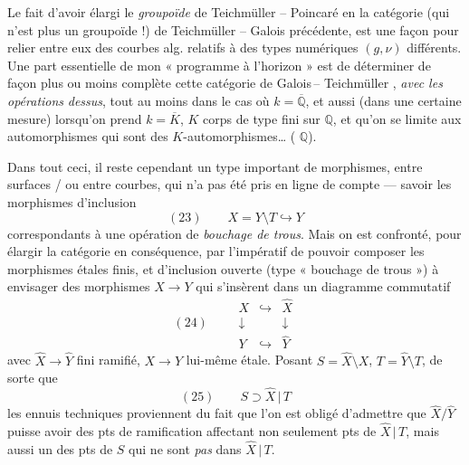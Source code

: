\documentclass[11pt,a4paper]{article}
\begin{document}
Le fait d'avoir élargi le \emph{groupoïde} de Teichmüller -- Poincaré en la catégorie (qui n'est plus un groupoïde !) de Teichmüller -- Galois précédente, est une façon \struck{\ill{}}  pour relier entre eux des courbes alg. relatifs à des types numériques $(g,\nu)$ différents. Une part essentielle de mon « programme à l'horizon » est de déterminer de façon plus ou moins complète cette catégorie de Galois\,-- Teichmüller , \emph{avec les opérations}  \emph{dessus}, tout au moins dans le cas où $k=\overline{\mathbb{Q}}$, et aussi (dans une certaine mesure) lorsqu'on prend \struck{\ill{}} $k=\overline{K}$, $K$ corps de type fini sur $\mathbb{Q}$, et qu'on se limite aux \struck{\ill{}} automorphismes  qui sont des $K$-automorphismes… ( $\mathbb{Q}$).


Dans tout ceci, il reste cependant un type important de morphismes, entre surfaces  /  ou entre  courbes, qui n'a pas été pris en ligne de compte — savoir les morphismes d'inclusion 
\[
  (23)\qquad X=Y\setminus T\hookrightarrow Y
\]
correspondants à une opération de \emph{bouchage de trous}. Mais on est confronté, pour élargir la catégorie en conséquence, par l'impératif de pouvoir composer les morphismes étales finis, et d'inclusion ouverte (type « bouchage de trous ») à envisager des morphismes $X\to Y$ qui s'insèrent dans un diagramme commutatif
\[
  (24)\qquad
  \begin{array}{ccc}
    X & \hookrightarrow & \hat{X}\\
    \downarrow & & \downarrow\\
    Y & \hookrightarrow & \hat{Y}
  \end{array}
\]
avec $\hat{X}\to\hat{Y}$ fini ramifié, $X\to Y$ lui-même étale. Posant $S=\hat{X}\setminus X$, $T=\hat{Y}\setminus T$, de sorte que
\[
  (25)\qquad S\supset\hat{X}\,|\,T
\]
les ennuis techniques proviennent du fait que l'on est obligé d'admettre que $\hat{X}/\hat{Y}$ puisse avoir des pts de ramification affectant non seulement  pts de $\hat{X}\,|\,T$, mais aussi un des pts de $S$ qui ne sont \emph{pas} dans $\hat{X}\,|\,T$.
\end{document}
